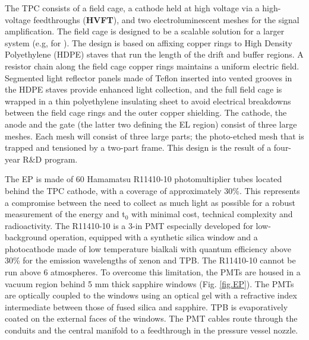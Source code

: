 The TPC consists of a field cage, a cathode held at high voltage via a high-voltage feedthroughs ({\bf HVFT}), and two electroluminescent meshes for the signal amplification.
The field cage is designed to be a scalable solution for a larger system (e.g, for \NHD).  The design is based on affixing copper rings to High Density Polyethylene (HDPE) staves that run the length of the drift and buffer regions.  
A resistor chain along the field cage copper rings maintains a uniform electric field. Segmented light reflector panels made of Teflon inserted into vented grooves in the HDPE staves provide enhanced light collection, and the full field cage is wrapped in a thin polyethylene insulating sheet to avoid electrical breakdowns between the field cage rings and the outer copper shielding.
The cathode, the anode and the gate (the latter two defining the EL region) consist of three large meshes.  Each mesh will consist of three large parts; the photo-etched mesh that is trapped and tensioned by a two-part frame. This design is the result of a four-year R$\&$D program.

\indent

The EP is made of 60 Hamamatsu R11410-10 photomultiplier tubes located behind the TPC cathode, with a coverage of approximately 30\%. This represents a compromise between the need to collect as much light as possible for a robust measurement of the energy and t$_0$ with minimal cost, technical complexity and radioactivity. The R11410-10 is a 3-in PMT especially developed for low-background operation, equipped with a synthetic silica window and a photocathode made of low temperature bialkali with quantum efficiency above 30\% for the emission wavelengths of xenon and TPB.
The R11410-10 cannot be run above 6 atmospheres. To overcome this limitation, the PMTs are housed in a vacuum region behind 5 mm thick sapphire windows (Fig. \ref{fig.EP}). The PMTs are optically coupled to the windows using an optical gel with a refractive index intermediate between those of fused silica and sapphire. TPB is evaporatively coated on the external faces of the windows. 
The PMT cables route through the conduits and the central manifold to a feedthrough in the pressure vessel nozzle.  

\indent

